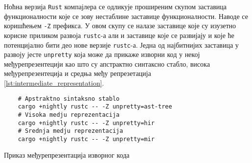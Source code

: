 Ноћна верзија \verb|Rust| компајлера се одликује проширеним скупом заставица функционалности које се зову 
нестаблине заставице функционалности. Наводе се коришћењем \verb|-Z| префикса. У овом скупу се налазе 
заставице које су изузетно корисне приликом развоја \verb|rustc|-а али и заставице које се развијају
и које ће потенцијално бити део нове верзије \verb|rustc|-а. Једна од најбитнијих заставица у развоју 
јесте \verb|unpretty| која може да прикаже изворни код у некој међурепрезентецији као што су
апстрактно синтаксно стабло, висока међурепрезентеција и средња међу репрезетација \ref{lst:intermediate_representation}.

\begin{listing}[H]
\begin{verbatim}
    # Apstraktno sintaksno stablo 
    cargo +nightly rustc -- -Z unpretty=ast-tree
    # Visoka medju reprezentacija
    cargo +nightly rustc -- -Z unpretty=hir
    # Srednja medju reprezentacija
    cargo +nightly rustc -- -Z unpretty=mir
\end{verbatim}
\caption{Приказ међурепрезентација изворног кода}
\label{lst:intermediate_representation}
\end{listing}